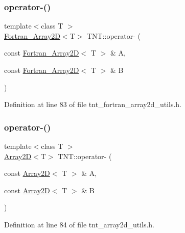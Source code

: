 \subsubsection{\texorpdfstring{operator-\/()}{operator-()}\hspace{0.1cm}{\footnotesize\ttfamily [3/7]}}
{\footnotesize\ttfamily template$<$class T $>$ \\
\hyperlink{classTNT_1_1Fortran__Array2D}{Fortran\+\_\+\+Array2D}$<$T$>$ T\+N\+T\+::operator-\/ (\begin{DoxyParamCaption}\item[{const \hyperlink{classTNT_1_1Fortran__Array2D}{Fortran\+\_\+\+Array2D}$<$ T $>$ \&}]{A,  }\item[{const \hyperlink{classTNT_1_1Fortran__Array2D}{Fortran\+\_\+\+Array2D}$<$ T $>$ \&}]{B }\end{DoxyParamCaption})}



Definition at line 83 of file tnt\+\_\+fortran\+\_\+array2d\+\_\+utils.\+h.

\mbox{\label{namespaceTNT_ad9068d45e117245c3ec39ee1f7f33f35}} 
\subsubsection{\texorpdfstring{operator-\/()}{operator-()}\hspace{0.1cm}{\footnotesize\ttfamily [4/7]}}
{\footnotesize\ttfamily template$<$class T $>$ \\
\hyperlink{classTNT_1_1Array2D}{Array2D}$<$T$>$ T\+N\+T\+::operator-\/ (\begin{DoxyParamCaption}\item[{const \hyperlink{classTNT_1_1Array2D}{Array2D}$<$ T $>$ \&}]{A,  }\item[{const \hyperlink{classTNT_1_1Array2D}{Array2D}$<$ T $>$ \&}]{B }\end{DoxyParamCaption})}



Definition at line 84 of file tnt\+\_\+array2d\+\_\+utils.\+h.

\mbox{\label{namespaceTNT_a673a55b86c9a9e0d59b29bf5214dd141}} 
